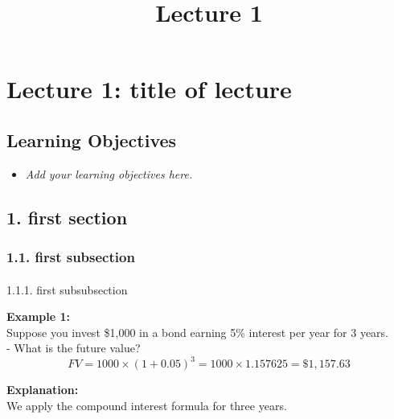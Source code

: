 \documentclass[
  letterpaper,
  DIV=11,
  numbers=noendperiod]{scrartcl}
\title{Lecture 1}
\author{}
\date{}
\makeatletter
\let\oldparagraph\paragraph
\renewcommand{\paragraph}{
    \@ifstar
      \xxxParagraphStar
      \xxxParagraphNoStar
  }
\newcommand{\xxxParagraphStar}[1]{\oldparagraph*{#1}\mbox{}}
\newcommand{\xxxParagraphNoStar}[1]{\oldparagraph{#1}\mbox{}}
\providecommand{\tightlist}{%
  \setlength{\itemsep}{0pt}\setlength{\parskip}{0pt}}
\renewcommand*\contentsname{Table of contents}
\newcommand\contentsname{Table of contents}
\makeatother
\begin{document}
\maketitle

\renewcommand*\contentsname{Table of contents}
{
\hypersetup{linkcolor=}
\setcounter{tocdepth}{3}
\tableofcontents
}

\section{Lecture 1: title of lecture}\label{lecture-1-title-of-lecture}

\subsection{Learning Objectives}\label{learning-objectives}

\begin{itemize}
\tightlist
\item
  \emph{Add your learning objectives here.}
\end{itemize}

\subsection{1. first section}\label{first-section}

\subsubsection{1.1. first subsection}\label{first-subsection}

\paragraph{1.1.1. first subsubsection}\label{first-subsubsection}

\begin{tcolorbox}[enhanced jigsaw, breakable, title=\textcolor{quarto-callout-note-color}{\faInfo}\hspace{0.5em}{Worked Example}, opacityback=0, coltitle=black, titlerule=0mm, opacitybacktitle=0.6, colback=white, bottomtitle=1mm, colframe=quarto-callout-note-color-frame, leftrule=.75mm, bottomrule=.15mm, toptitle=1mm, arc=.35mm, rightrule=.15mm, toprule=.15mm, colbacktitle=quarto-callout-note-color!10!white, left=2mm]

\textbf{Example 1:}\\
Suppose you invest \$1,000 in a bond earning 5\% interest per year for 3
years.\\
- What is the future value?\\
\[
FV = 1000 \times (1 + 0.05)^3 = 1000 \times 1.157625 = \$1,157.63
\]

\textbf{Explanation:}\\
We apply the compound interest formula for three years.

\end{tcolorbox}
\end{document}
